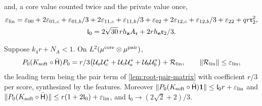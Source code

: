 and, a core value counted twice and the private value once,
\begin{gather*}
 \varepsilon_{\rm lin}=\varepsilon_{00}+2\varepsilon_{01,c}+\varepsilon_{01,b}/3+2\varepsilon_{11,c}+\varepsilon_{11,b}/3
 +\varepsilon_{02}+2\varepsilon_{12,c}+\varepsilon_{12,b}/3+\varepsilon_{22}+qr\mathfrak r_2^2,\\
 \mathfrak l_0=2\sqrt{30}\,rh_{\mathbf z}A_{\mathfrak r}+2rh_{\mathbf e}\mathfrak r_2/3 .
\end{gather*}

\begin{lemma}\label{lem:root-linear}
Suppose $k_4r+N_A<1$. On $L^2(\mu^{\rm core}\otimes\mu^{\rm pair})$,
\[
 P_0(K_{\rm soft}\circ\bar{\mathsf H})P_0=r/3\bigl(\mathcal U_a\mathcal U_c^*+\mathcal U_c\mathcal U_a^*
 +\mathcal U_b\mathcal U_b^*\bigr)+\mathcal R_{\rm lin},\qquad
 \|\mathcal R_{\rm lin}\|\le\varepsilon_{\rm lin},
\]
the leading term being the pair term of \cref{lem:root-pair-matrix} with coefficient
$r/3$ per score, synthesized by the features. Moreover
$\|P_0(K_{\rm soft}\circ\bar{\mathsf H})\mathbf 1\|\le\mathfrak l_0r+\varepsilon_{\rm lin}$ and
$\|P_0(K_{\rm soft}\circ\bar{\mathsf H})\|\le r(1+2\mathfrak l_0)+\varepsilon_{\rm lin}$, and
$\mathfrak l_0\to(2\sqrt2+2)/3$.
\end{lemma}

